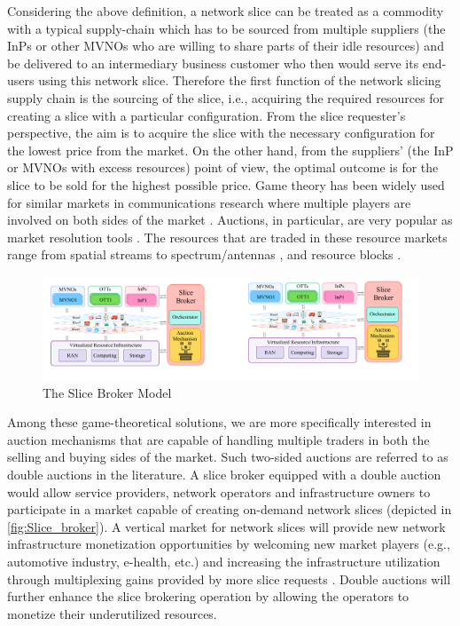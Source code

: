 Considering the above definition, a network slice can be treated as a commodity with a typical supply-chain which has to be sourced from multiple suppliers (the \acp{InP} or other \acp{MVNO} who are willing to share parts of their idle resources) and be delivered to an intermediary business customer who then would serve its end-users using this network slice.
Therefore the first function of the network slicing supply chain is the sourcing of the slice, i.e., acquiring the required resources for creating a slice with a particular configuration. From the slice requester's perspective, the aim is to acquire the slice with the necessary configuration for the lowest price from the market. On the other hand, from the suppliers' (the \ac{InP} or \acp{MVNO} with excess resources) point of view, the optimal outcome is for the slice to be sold for the highest possible price. Game theory has been widely used for similar markets in communications research where multiple players are involved on both sides of the market \cite{CHARILAS20103421}. 
Auctions, in particular, are very popular as market resolution tools \cite{8480631}. The resources that are traded in these resource markets range from spatial streams \cite{7842378} to spectrum/antennas \cite{7600959}, and resource blocks \cite{resource_blocks_auction}.
\begin{figure}[htbp]
    \centering
    \includegraphics[width=0.8\columnwidth]{Figures/ICC-model.pdf}
    \caption{The Slice Broker Model}
    \label{fig:Slice_broker}
\end{figure}


Among these game-theoretical solutions, we are more specifically interested in auction mechanisms that are capable of handling multiple traders in both the selling and buying sides of the market. Such two-sided auctions are referred to as double auctions in the literature. A slice broker equipped with a double auction would allow service providers, network operators and infrastructure owners to participate in a market capable of creating on-demand network slices (depicted in \autoref{fig:Slice_broker}). A vertical market for network slices will provide new network infrastructure monetization opportunities by welcoming new market players (e.g., automotive industry,
e-health, etc.) and increasing the infrastructure utilization
through multiplexing gains provided by more slice requests \cite{ONETS}. Double auctions will further enhance the slice brokering operation by allowing the operators to monetize their underutilized resources. 


